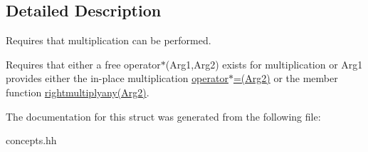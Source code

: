 \subsection{Detailed Description}
Requires that multiplication can be performed. 

Requires that either a free operator$\ast$(\-Arg1,\-Arg2) exists for multiplication or Arg1 provides either the in-\/place multiplication \hyperlink{structRFFGen_1_1Concepts_1_1MultiplicationConcept_a65cf060bcfd7bd39b527de6c87056539}{operator$\ast$=(\-Arg2)} or the member function \hyperlink{structRFFGen_1_1Concepts_1_1MultiplicationConcept_ae876451286ab0e902a5cec841ad01f2e}{rightmultiplyany(\-Arg2)}. 

The documentation for this struct was generated from the following file\-:\begin{DoxyCompactItemize}
\item 
concepts.\-hh\end{DoxyCompactItemize}
